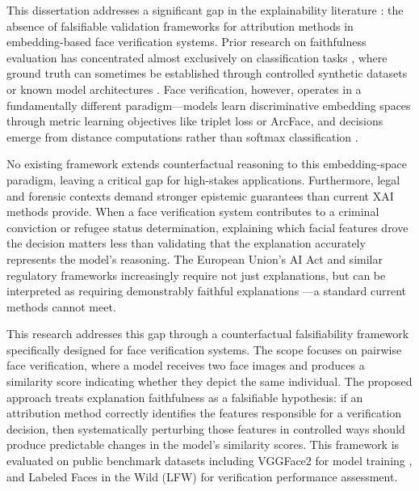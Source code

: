 This dissertation addresses a significant gap in the explainability literature \cite{Samek2021_XAI_Review}: the absence of falsifiable validation frameworks for attribution methods in embedding-based face verification systems. Prior research on faithfulness evaluation has concentrated almost exclusively on classification tasks \cite{arrieta2020explainable}, where ground truth can sometimes be established through controlled synthetic datasets or known model architectures \cite{Zhou2022_AttributionCorrectness,Adebayo2018_SanityChecks}. Face verification, however, operates in a fundamentally different paradigm---models learn discriminative embedding spaces through metric learning objectives like triplet loss or ArcFace, and decisions emerge from distance computations rather than softmax classification \cite{schroff2015facenet,deng2019arcface,kaya2019metric}.

No existing framework extends counterfactual reasoning \cite{wachter2017counterfactual,Kenny2021_PlausibleCounterfactuals,mothilal2020diverse} to this embedding-space paradigm, leaving a critical gap for high-stakes applications. Furthermore, legal and forensic contexts demand stronger epistemic guarantees than current XAI methods provide. When a face verification system contributes to a criminal conviction or refugee status determination, explaining which facial features drove the decision matters less than validating that the explanation accurately represents the model's reasoning. The European Union's AI Act and similar regulatory frameworks increasingly require not just explanations, but can be interpreted as requiring demonstrably faithful explanations \cite{euaiact2024}---a standard current methods cannot meet.

This research addresses this gap through a counterfactual falsifiability framework specifically designed for face verification systems. The scope focuses on pairwise face verification, where a model receives two face images and produces a similarity score indicating whether they depict the same individual. The proposed approach treats explanation faithfulness as a falsifiable hypothesis: if an attribution method correctly identifies the features responsible for a verification decision, then systematically perturbing those features in controlled ways should produce predictable changes in the model's similarity scores. This framework is evaluated on public benchmark datasets including VGGFace2 for model training \cite{cao2018vggface2}, and Labeled Faces in the Wild (LFW) \cite{huang2007lfw} for verification performance assessment.

